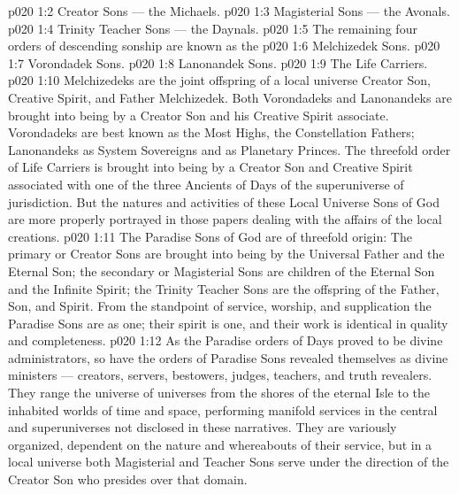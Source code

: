 \vs p020 1:2 \bibnobreakspace Creator Sons --- the Michaels.
\vs p020 1:3 \bibnobreakspace Magisterial Sons --- the Avonals.
\vs p020 1:4 \bibnobreakspace Trinity Teacher Sons --- the Daynals.
\vs p020 1:5 \pc The remaining four orders of descending sonship are known as the 
\vs p020 1:6 \bibnobreakspace Melchizedek Sons.
\vs p020 1:7 \bibnobreakspace Vorondadek Sons.
\vs p020 1:8 \bibnobreakspace Lanonandek Sons.
\vs p020 1:9 \bibnobreakspace The Life Carriers.
\vs p020 1:10 \pc Melchizedeks are the joint offspring of a local universe Creator Son, Creative Spirit, and Father Melchizedek. Both Vorondadeks and Lanonandeks are brought into being by a Creator Son and his Creative Spirit associate. Vorondadeks are best known as the Most Highs, the Constellation Fathers; Lanonandeks as System Sovereigns and as Planetary Princes. The threefold order of Life Carriers is brought into being by a Creator Son and Creative Spirit associated with one of the three Ancients of Days of the superuniverse of jurisdiction. But the natures and activities of these Local Universe Sons of God are more properly portrayed in those papers dealing with the affairs of the local creations.
\vs p020 1:11 \pc The Paradise Sons of God are of threefold origin: The primary or Creator Sons are brought into being by the Universal Father and the Eternal Son; the secondary or Magisterial Sons are children of the Eternal Son and the Infinite Spirit; the Trinity Teacher Sons are the offspring of the Father, Son, and Spirit. From the standpoint of service, worship, and supplication the Paradise Sons are as one; their spirit is one, and their work is identical in quality and completeness.
\vs p020 1:12 As the Paradise orders of Days proved to be divine administrators, so have the orders of Paradise Sons revealed themselves as divine ministers --- creators, servers, bestowers, judges, teachers, and truth revealers. They range the universe of universes from the shores of the eternal Isle to the inhabited worlds of time and space, performing manifold services in the central and superuniverses not disclosed in these narratives. They are variously organized, dependent on the nature and whereabouts of their service, but in a local universe both Magisterial and Teacher Sons serve under the direction of the Creator Son who presides over that domain.
